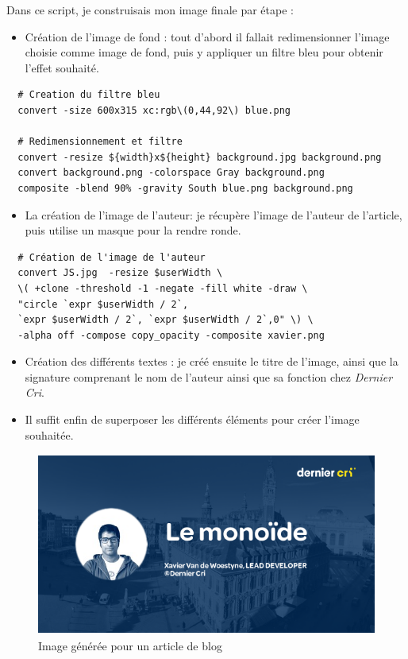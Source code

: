 \documentclass[12pt,a4paper]{article}
\providecommand{\tightlist}{%
  \setlength{\itemsep}{0pt}\setlength{\parskip}{0pt}}
\begin{document}
  \bigskip

  Dans ce script, je construisais mon image finale par étape :

  \begin{itemize}
  \tightlist
  \item
    Création de l'image de fond : tout d'abord il fallait redimensionner
    l'image choisie comme image de fond, puis y appliquer un filtre bleu
    pour obtenir l'effet souhaité.
  \end{itemize}

  \begin{verbatim}
  # Creation du filtre bleu
  convert -size 600x315 xc:rgb\(0,44,92\) blue.png

  # Redimensionnement et filtre
  convert -resize ${width}x${height} background.jpg background.png
  convert background.png -colorspace Gray background.png
  composite -blend 90% -gravity South blue.png background.png
  \end{verbatim}

  \begin{itemize}
  \tightlist
  \item
    La création de l'image de l'auteur: je récupère l'image de l'auteur de
    l'article, puis utilise un masque pour la rendre ronde.
  \end{itemize}

  \begin{verbatim}
  # Création de l'image de l'auteur
  convert JS.jpg  -resize $userWidth \
  \( +clone -threshold -1 -negate -fill white -draw \
  "circle `expr $userWidth / 2`,
  `expr $userWidth / 2`, `expr $userWidth / 2`,0" \) \
  -alpha off -compose copy_opacity -composite xavier.png
  \end{verbatim}

  \begin{itemize}
  \item
    Création des différents textes : je créé ensuite le titre de l'image,
    ainsi que la signature comprenant le nom de l'auteur ainsi que sa
    fonction chez \emph{Dernier Cri}.
  \item
    Il suffit enfin de superposer les différents éléments pour créer
    l'image souhaitée.
  \end{itemize}

  \begin{figure}[h]
    \centering
    \includegraphics[height=6cm]{figures/blog.png}
    \caption{Image générée pour un article de blog}
  \end{figure}
\end{document}

